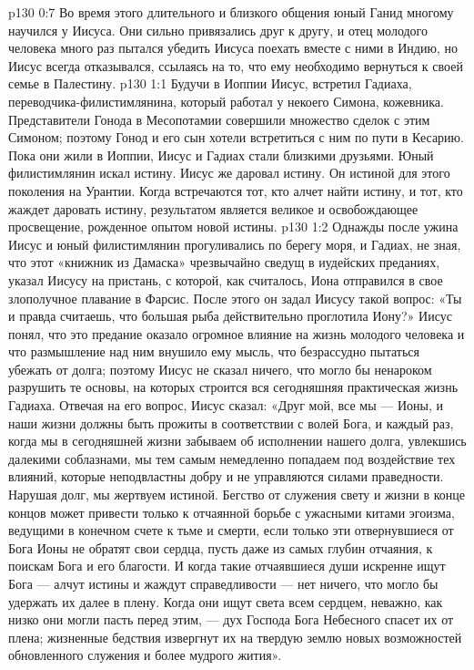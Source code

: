 \vs p130 0:7 Во время этого длительного и близкого общения юный Ганид многому научился у Иисуса. Они сильно привязались друг к другу, и отец молодого человека много раз пытался убедить Иисуса поехать вместе с ними в Индию, но Иисус всегда отказывался, ссылаясь на то, что ему необходимо вернуться к своей семье в Палестину.
\vs p130 1:1 Будучи в Иоппии Иисус, встретил Гадиаха, переводчика\hyp{}филистимлянина, который работал у некоего Симона, кожевника. Представители Гонода в Месопотамии совершили множество сделок с этим Симоном; поэтому Гонод и его сын хотели встретиться с ним по пути в Кесарию. Пока они жили в Иоппии, Иисус и Гадиах стали близкими друзьями. Юный филистимлянин искал истину. Иисус же даровал истину. Он  истиной для этого поколения на Урантии. Когда встречаются тот, кто алчет найти истину, и тот, кто жаждет даровать истину, результатом является великое и освобождающее просвещение, рожденное опытом новой истины.
\vs p130 1:2 Однажды после ужина Иисус и юный филистимлянин прогуливались по берегу моря, и Гадиах, не зная, что этот «книжник из Дамаска» чрезвычайно сведущ в иудейских преданиях, указал Иисусу на пристань, с которой, как считалось, Иона отправился в свое злополучное плавание в Фарсис. После этого он задал Иисусу такой вопрос: «Ты и правда считаешь, что большая рыба действительно проглотила Иону?» Иисус понял, что это предание оказало огромное влияние на жизнь молодого человека и что размышление над ним внушило ему мысль, что безрассудно пытаться убежать от долга; поэтому Иисус не сказал ничего, что могло бы ненароком разрушить те основы, на которых строится вся сегодняшняя практическая жизнь Гадиаха. Отвечая на его вопрос, Иисус сказал: «Друг мой, все мы --- Ионы, и наши жизни должны быть прожиты в соответствии с волей Бога, и каждый раз, когда мы в сегодняшней жизни забываем об исполнении нашего долга, увлекшись далекими соблазнами, мы тем самым немедленно попадаем под воздействие тех влияний, которые неподвластны добру и не управляются силами праведности. Нарушая долг, мы жертвуем истиной. Бегство от служения свету и жизни в конце концов может привести только к отчаянной борьбе с ужасными китами эгоизма, ведущими в конечном счете к тьме и смерти, если только эти отвернувшиеся от Бога Ионы не обратят свои сердца, пусть даже из самых глубин отчаяния, к поискам Бога и его благости. И когда такие отчаявшиеся души искренне ищут Бога --- алчут истины и жаждут справедливости --- нет ничего, что могло бы удержать их далее в плену. Когда они ищут света всем сердцем, неважно, как низко они могли пасть перед этим, --- дух Господа Бога Небесного спасет их от плена; жизненные бедствия извергнут их на твердую землю новых возможностей обновленного служения и более мудрого жития».

